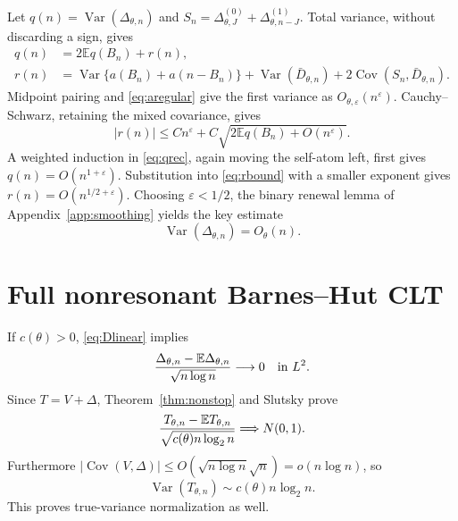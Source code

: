 \documentclass[11pt]{article}
\numberwithin{equation}{section}
\theoremstyle{definition}\newtheorem{definition}[theorem]{Definition}
\theoremstyle{remark}\newtheorem{remark}[theorem]{Remark}
\newcommand{\E}{\mathbb E}\newcommand{\Pp}{\mathbb P}
\newcommand{\Var}{\operatorname {Var}}\newcommand{\Cov}{\operatorname {Cov}}
\newcommand{\1}{\mathbf 1}\newcommand{\cD}{\mathcal D}
\begin{document}
Let $q(n)=\Var(\Delta_{\theta,n})$ and
$S_n=\Delta^{(0)}_{\theta,J}+\Delta^{(1)}_{\theta,n-J}$.  Total variance,
without discarding a sign, gives
\begin{align}
 q(n)&=2\E q(B_n)+r(n),                                       \label{eq:qrec}\\
 r(n)&=\Var\{a(B_n)+a(n-B_n)\}+\Var(\bar D_{\theta,n})
       +2\Cov(S_n,\bar D_{\theta,n}).                         \label{eq:forcing}
\end{align}
Midpoint pairing and \eqref{eq:aregular} give the first variance as
$O_{\theta,\varepsilon}(n^\varepsilon)$.  Cauchy--Schwarz, retaining the
mixed covariance, gives
\begin{equation}|r(n)|\le Cn^\varepsilon+C
 \sqrt{2\E q(B_n)+O(n^\varepsilon)}.                           \label{eq:rbound}
\end{equation}
A weighted induction in \eqref{eq:qrec}, again moving the self-atom left,
first gives $q(n)=O(n^{1+\varepsilon})$.  Substitution into
\eqref{eq:rbound} with a smaller exponent gives
$r(n)=O(n^{1/2+\varepsilon})$.  Choosing $\varepsilon<1/2$, the binary
renewal lemma of Appendix~\ref{app:smoothing} yields the key estimate
\begin{equation}\boxed{\Var(\Delta_{\theta,n})=O_\theta(n).}   \label{eq:Dlinear}
\end{equation}

\clearpage
\section{Full nonresonant Barnes--Hut CLT}\label{sec:fullnon}
If $c(\theta)>0$, \eqref{eq:Dlinear} implies
\begin{equation}{\Delta_{\theta,n}-\E\Delta_{\theta,n}\over
 \sqrt{n\log n}}\longrightarrow0\quad\hbox{in }L^2.           \label{eq:Dnegligible}
\end{equation}
Since $T=V+\Delta$, Theorem~\ref{thm:nonstop} and Slutsky prove
\begin{equation}{T_{\theta,n}-\E T_{\theta,n}\over
 \sqrt{c(\theta)n\log_2n}}\Longrightarrow N(0,1).             \label{eq:TnonCLT}
\end{equation}
Furthermore
$|\Cov(V,\Delta)|\le O(\sqrt{n\log n}\sqrt n)=o(n\log n)$, so
\begin{equation}\Var(T_{\theta,n})\sim c(\theta)n\log_2n.     \label{eq:TnonVar}
\end{equation}
This proves true-variance normalization as well.

\clearpage
\end{document}
